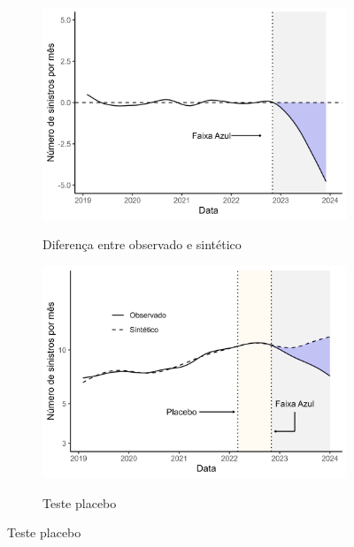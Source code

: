 \begin{figure}[h]
    \caption{Análise do controle sintético}
    \begin{subfigure}[t]{0.45\linewidth}
        \centering
        \caption{Diferença entre observado e sintético}
        \includegraphics[width = 0.9\linewidth]{relatorios/faixa-azul/figuras/sintetico_dif.png}
        \label{fig:bandeirantes_dif}
    \end{subfigure}
    \hfill
    \begin{subfigure}[t]{0.45\linewidth}
        \centering
        \caption{Teste placebo}
        \includegraphics[width = 0.9\linewidth]{relatorios/faixa-azul/figuras/placebo.png}
        \label{fig:bandeirantes_placebo}
    \end{subfigure}
\end{figure}

